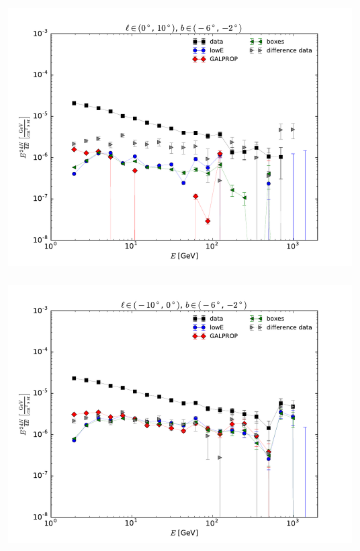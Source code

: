 \begin{figure}
{\begin{subfigure}[b]{.4\textwidth}
		\centering \includegraphics[width=.95\textwidth]{plots/SED_all_left-right__l=5_b=-4.pdf}
		\end{subfigure}%
		\begin{subfigure}[b]{.4\textwidth}
		\centering \includegraphics[width=.95\textwidth]{plots/SED_all_left-right__l=-5_b=-4.pdf}
	\end{subfigure}%
}
\vspace*{-0.2cm}
\end{figure}
